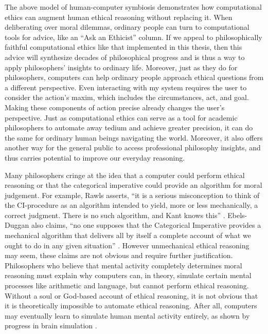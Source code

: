 \begin{isabellebody}
\begin{isamarkuptext}
The above model of human-computer symbiosis demonstrates how computational ethics can augment human
ethical reasoning without replacing it. When deliberating over moral dilemmas, ordinary people can 
turn to computational tools for advice, like an ``Ask an Ethicist'' column. If we appeal to philosophically
faithful computational ethics like that implemented in this thesis, then this advice will synthesize 
decades of philosophical progress and is thus a way to apply philosophers' insights to ordinary life. 
Moreover, just as they do for philosophers, computers can help ordinary people approach ethical questions from a 
different perspective. Even interacting with my system requires the user to consider the action's maxim, 
which includes the circumstances, act, and goal. Making these components of action precise already changes
the user's perspective. Just as computational ethics can serve as a tool for academic philosophers to 
automate away tedium and achieve greater precision, it can do the same for ordinary human beings navigating
the world. Moreover, it also offers another way for the general public to access professional philosophy
insights, and thus carries potential to improve our everyday reasoning.%
\end{isamarkuptext}\isamarkuptrue%
%
\isadelimdocument
%
\endisadelimdocument
%
\isatagdocument
%
\isamarkuptrue%
%
\endisatagdocument
{\isafolddocument}%
%
\isadelimdocument
%
\endisadelimdocument
%
\begin{isamarkuptext}%
Many philosophers cringe at the idea that a computer could perform ethical reasoning or that the 
categorical imperative could provide an algorithm for moral judgement. For example, Rawls asserts, 
``it is a serious misconception to think of the CI-procedure as an algorithm intended to yield, 
more or less mechanically, a correct judgment. There is no such algorithm, and Kant knows this'' \citep[166]{rawlslectures}. 
Ebels-Duggan also claims, ``no one supposes that the Categorical Imperative provides a mechanical 
algorithm that delivers all by itself a complete account of what we ought to do in any given 
situation'' \citep[174]{ebelsduggan}. However unmechanical ethical reasoning
may seem, these claims are not obvious and require further justification. Philosophers who believe 
that mental activity completely determines moral reasoning must explain why computers can, in theory, 
simulate certain mental processes like arithmetic and language, but cannot perform ethical reasoning. 
Without a soul or God-based account of ethical reasoning, it is not obvious that it is theoretically 
impossible to automate ethical reasoning. After all, computers may eventually learn to simulate human 
mental activity entirely, as shown by progress in brain simulation \citep{brainsimulation}. 


\end{isamarkuptext}
\end{isabellebody}
